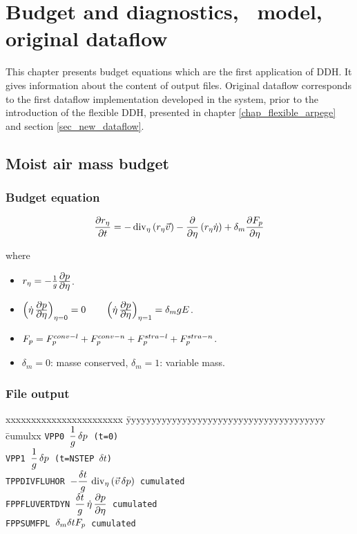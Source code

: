 \chapter{Budget and diagnostics, \arp\ model, original dataflow}
\null
\vspace{1cm}
This chapter presents budget equations which are the first application of DDH. It gives information about the content of output files. Original dataflow corresponds to the first dataflow implementation developed in the system, prior to the introduction of the flexible DDH, presented in chapter \ref{chap_flexible_arpege} and section \ref{sec_new_dataflow}.

\section{Moist air mass budget}
\subsection*{Budget equation}
$$
\frac{\displaystyle \partial r_{\eta}}{\displaystyle \partial t}=
- \mathop{\rm div}\nolimits_{\eta}\left(r_{\eta}\vec{v}\right)
- \frac{\displaystyle \partial }{\displaystyle \partial \eta}\left(r_{\eta}\dot{\eta}\right)
+ \delta_m \frac{\displaystyle \partial F_{p}}{\displaystyle \partial \eta}
$$

\noi where
\begin{itemize}
        \item $r_{\eta}=-\frac{1}{g}\frac{\displaystyle \partial p}{\displaystyle \partial \eta}$.
        \item $ \left( \dot \eta \,\frac{\displaystyle \partial p}{\displaystyle \partial \eta} \right)_{\eta=0} = 0 \qquad \left( \dot \eta \,\frac{\displaystyle \partial p}{\displaystyle \partial \eta} \right)_{\eta=1} = 
              \delta_m gE $.
        \item $F_{p} = F_{p}^{conv-l}+F_{p}^{conv-n}+F_{p}^{stra-l}+F_{p}^{stra-n}$.
  \item $\delta_m =0$: masse conserved, $\delta_m=1$: variable mass.
\end{itemize}

\subsection*{File output}

\begin{tabbing}
xxxxxxxxxxxxxxxxxxxxxxx \= yyyyyyyyyyyyyyyyyyyyyyyyyyyyyyyyyyyyyyy \= cumulxx \kill
\tt VPP0 \> $\displaystyle \frac 1g \,\delta p$ (t=0) \\[1ex]
\tt VPP1 \> $\displaystyle \frac 1g \,\delta p$ (t=NSTEP $\delta t$) \\[1ex]
\tt TPPDIVFLUHOR \> $\displaystyle -\frac{\delta t}g \,\mathop{\rm div}\nolimits_{\eta} \left( \vec v\,\delta p \right)$ \> cumulated\\[1ex]
\tt FPPFLUVERTDYN \> $\displaystyle \frac{\delta t}g \,\dot\eta\,\frac{\displaystyle \partial p}{\displaystyle \partial \eta}$ \> cumulated\\[1ex]
\tt FPPSUMFPL \> $\displaystyle \delta_m \delta t F_{p}$ \> cumulated
\end{tabbing}

